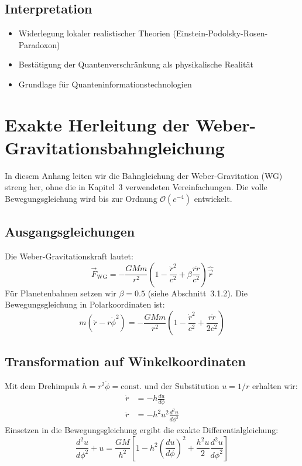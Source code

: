 \subsection{Interpretation}
\begin{itemize}
\item Widerlegung lokaler realistischer Theorien (Einstein-Podolsky-Rosen-Paradoxon)
\item Bestätigung der Quantenverschränkung als physikalische Realität
\item Grundlage für Quanteninformationstechnologien
\end{itemize}

\newpage
\section{Exakte Herleitung der Weber-Gravitationsbahngleichung}
\label{sec:exakte_herleitung}

In diesem Anhang leiten wir die Bahngleichung der Weber-Gravitation (WG) streng her, ohne die in Kapitel~3 verwendeten Vereinfachungen. Die volle Bewegungsgleichung wird bis zur Ordnung $\mathcal{O}(c^{-4})$ entwickelt.

\subsection{Ausgangsgleichungen}
Die Weber-Gravitationskraft lautet:
\begin{equation}
\vec{F}_{\text{WG}} = -\frac{GMm}{r^2} \left(1 - \frac{\dot{r}^2}{c^2} + \beta \frac{r\ddot{r}}{c^2}\right)\hat{\vec{r}}
\end{equation}
Für Planetenbahnen setzen wir $\beta = 0.5$ (siehe Abschnitt~3.1.2). Die Bewegungsgleichung in Polarkoordinaten ist:
\begin{equation}
m\left(\ddot{r} - r\dot{\phi}^2\right) = -\frac{GMm}{r^2}\left(1 - \frac{\dot{r}^2}{c^2} + \frac{r\ddot{r}}{2c^2}\right)
\end{equation}

\subsection{Transformation auf Winkelkoordinaten}
Mit dem Drehimpuls $h = r^2\dot{\phi} = \text{const.}$ und der Substitution $u = 1/r$ erhalten wir:
\begin{align}
\dot{r} &= -h\frac{du}{d\phi} \\
\ddot{r} &= -h^2u^2\frac{d^2u}{d\phi^2}
\end{align}
Einsetzen in die Bewegungsgleichung ergibt die exakte Differentialgleichung:
\begin{equation}
\frac{d^2u}{d\phi^2} + u = \frac{GM}{h^2}\left[1 - h^2\left(\frac{du}{d\phi}\right)^2 + \frac{h^2u}{2}\frac{d^2u}{d\phi^2}\right]
\end{equation}

